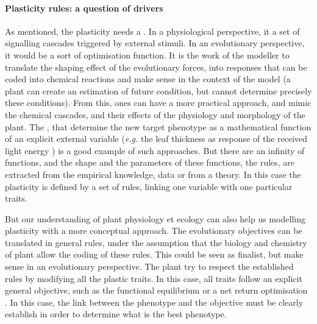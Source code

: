 \paragraph{Plasticity rules: a question of drivers}

As mentioned, the plasticity needs a . In a physiological perspective, it a set of signalling cascades triggered by external stimuli. In an evolutionary perspective, it would be a sort of optimisation function. It is the work of the modeller to translate the shaping effect of the evolutionary forces, into responses that can be coded into chemical reactions and make sense in the context of the model (a plant can create an estimation of future condition, but cannot determine precisely these conditions). From this, ones can have a more practical approach, and mimic the chemical cascades, and their effects of the physiology and morphology of the plant. The , that determine the new target phenotype as a mathematical function of an explicit external variable (\textit{e.g.} the leaf thickness as response of the received light energy \parencite{feller_mathematical_2015}) is a good example of such approaches. But there are an infinity of functions, and the shape and the parameters of these functions, the rules, are extracted from the empirical knowledge, data or from a theory. In this case the plasticity is defined by a set of rules, linking one variable with one particular traits.

But our understanding of plant physiology et ecology can also help us modelling plasticity with a more conceptual approach. The evolutionary objectives can be translated in general rules, under the assumption that the biology and chemistry of plant allow the coding of these rules. This could be seen as finalist, but make sense in an evolutionary perspective. The plant try to respect the established rules by modifying all the plastic traits. In this case, all traits follow an explicit general objective, such as the functional equilibrium \parencite{hirose_vegetative_1987, lohier_explaining_2014} or a net return optimisation \parencite{mcmurtrie_leaf-trait_2011}. In this case, the link between the phenotype and the objective must be clearly establish in order to determine what is the best phenotype.

